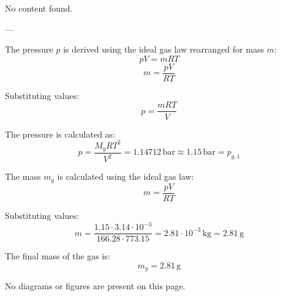 No content found.

---

The pressure \( p \) is derived using the ideal gas law rearranged for mass \( m \):  
\[
pV = mR T
\]  
\[
m = \frac{pV}{RT}
\]  

Substituting values:  
\[
p = \frac{mR T}{V}
\]  

The pressure is calculated as:  
\[
p = \frac{M_g R T^2}{V^2} = 1.14712 \, \text{bar} \approx 1.15 \, \text{bar} = p_{g,1}
\]  

The mass \( m_g \) is calculated using the ideal gas law:  
\[
m = \frac{pV}{RT}
\]  

Substituting values:  
\[
m = \frac{1.15 \cdot 3.14 \cdot 10^{-3}}{166.28 \cdot 773.15} = 2.81 \cdot 10^{-3} \, \text{kg} = 2.81 \, \text{g}
\]  

The final mass of the gas is:  
\[
m_g = 2.81 \, \text{g}
\]  

No diagrams or figures are present on this page.